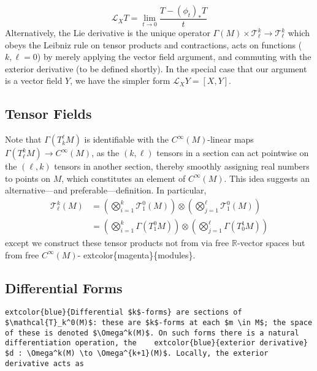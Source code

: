 \documentclass[
]{book}
\begin{document}
\begin{equation}     
    \mathcal{L}_X T = \lim_{t \to 0} \frac{T - (\phi_t)_* T}{t} 
\end{equation}
Alternatively, the Lie derivative is the unique operator \(\Gamma(M) \times \mathcal{T}_\ell^k \to \mathcal{T}_\ell^k\) which obeys the Leibniz rule on tensor products and contractions, acts on functions (\(k, \ell = 0\)) by merely applying the vector field argument, and commuting with the exterior derivative (to be defined shortly). In the special case that our argument is a vector field \(Y\), we have the simpler form \(\mathcal{L}_X Y = [X,Y]\).

\hypertarget{tensor-fields}{%
\subsection{Tensor Fields}\label{tensor-fields}}

Note that \(\Gamma(T_k^\ell M)\) is identifiable with the \(C^\infty(M)\)-linear maps \(\Gamma(T_\ell^k M) \to C^\infty(M)\), as the \((k,\ell)\) tensors in a section can act pointwise on the \((\ell,k)\) tensors in another section, thereby smoothly assigning real numbers to points on \(M\), which constitutes an element of \(C^\infty(M)\). This idea suggests an alternative---and preferable---definition. In particular,
\begin{align*} 
    \mathcal{T}_\ell^k(M) &= \left(\bigotimes_{i=1}^k \mathcal{T}_1^0(M)\right) \otimes     \left(\bigotimes_{j=1}^\ell \mathcal{T}_1^0(M)\right) \\ 
    &= \left(\bigotimes_{i=1}^k \Gamma(T_1^0 M)\right) \otimes \left(\bigotimes_{j=1}^\ell \Gamma(T_0^1 M)\right) 
\end{align*}
except we construct these tensor products not from via free \(\mathbb{R}\)-vector spaces but from free \(C^\infty(M)\)- extcolor\{magenta\}\{modules\}.

\hypertarget{differential-forms}{%
\subsection{Differential Forms}\label{differential-forms}}

\begin{verbatim}
extcolor{blue}{Differential $k$-forms} are sections of $\mathcal{T}_k^0(M)$: these are $k$-forms at each $m \in M$; the space of these is denoted $\Omega^k(M)$. On such forms there is a natural differentiation operation, the    extcolor{blue}{exterior derivative} $d : \Omega^k(M) \to \Omega^{k+1}(M)$. Locally, the exterior derivative acts as 
\end{verbatim}
\end{document}
